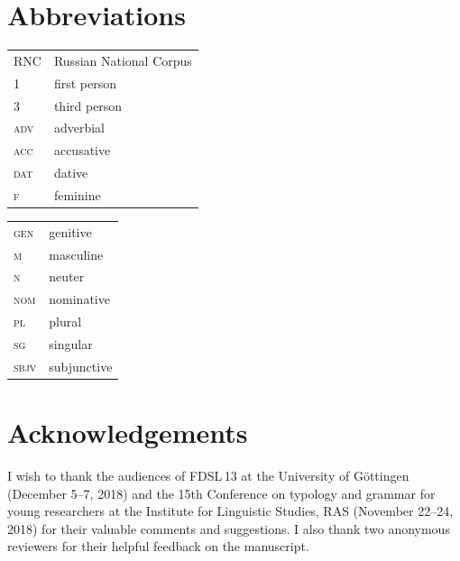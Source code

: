 \documentclass[output=paper]{langscibook}
\begin{document}
\section*{Abbreviations}

\begin{tabularx}{.5\textwidth}{@{}lX}
RNC & Russian National Corpus\\
\textsc{1} & first person\\
\textsc{3} & third person\\
\textsc{adv} & adverbial\\
\textsc{acc} & accusative\\
\textsc{dat} & dative\\
\textsc{f} & feminine\\
\end{tabularx}%
\begin{tabularx}{.5\textwidth}{lX@{}}
\textsc{gen} & genitive\\
\textsc{m} & masculine\\
\textsc{n} & neuter\\
\textsc{nom} & nominative\\
\textsc{pl} & plural\\
\textsc{sg} & singular\\
\textsc{sbjv} & subjunctive\\ %
\end{tabularx}


\section*{Acknowledgements}

I wish to thank the audiences of FDSL\,13 at the University of Göttingen (December 5--7, 2018) and the 15th Conference on typology and grammar for young researchers at the Institute for Linguistic Studies, RAS (November 22--24, 2018) for their valuable comments and suggestions. I also thank two anonymous reviewers for their helpful feedback on the manuscript.

{\sloppy\printbibliography[heading=subbibliography,notkeyword=this]}
\end{document}

